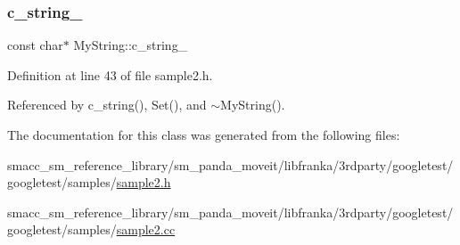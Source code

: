 \subsubsection{\texorpdfstring{c\+\_\+string\+\_\+}{c\_string\_}}
{\footnotesize\ttfamily const char$\ast$ My\+String\+::c\+\_\+string\+\_\+\hspace{0.3cm}{\ttfamily [private]}}



Definition at line 43 of file sample2.\+h.



Referenced by c\+\_\+string(), Set(), and $\sim$\+My\+String().



The documentation for this class was generated from the following files\+:\begin{DoxyCompactItemize}
\item 
smacc\+\_\+sm\+\_\+reference\+\_\+library/sm\+\_\+panda\+\_\+moveit/libfranka/3rdparty/googletest/googletest/samples/\hyperlink{sample2_8h}{sample2.\+h}\item 
smacc\+\_\+sm\+\_\+reference\+\_\+library/sm\+\_\+panda\+\_\+moveit/libfranka/3rdparty/googletest/googletest/samples/\hyperlink{sample2_8cc}{sample2.\+cc}\end{DoxyCompactItemize}
